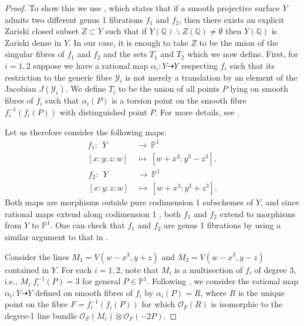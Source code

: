 \documentclass[11pt]{amsart}
\newcommand{\QQ}{\mathbb{Q}}
\newcommand{\PP}{\mathbb{P}}
\theoremstyle{plain}
\theoremstyle{remark}
\begin{document}
\begin{proof}
To show this we use \cite[Proposition 3.8]{twofibs}, which states that if a smooth projective surface $Y$ admits two different genus 1 fibrations $f_1$ and $f_2$, then there exists an explicit Zariski closed subset $Z\subset Y$ such that if $Y(\QQ)\backslash Z(\QQ)\neq \emptyset$ then $Y(\QQ)$ is Zariski dense in $Y$. 
In our case, it is enough to take $Z$ to be the union of the singular fibres of $f_1$ and $f_2$ and the sets $T_1$ and $T_2$ which we now define. First, for $i=1,2$ suppose we have a rational map $\alpha_i:Y\dashrightarrow Y$ respecting $f_i$ such that its restriction to the generic fibre $\mathcal{Y}_i$ is not merely a translation by an element of the Jacobian $J(\mathcal{Y}
_i)$. We define $T_i$ to be the union of all points $P$ lying on smooth fibres of $f_i$ such that $\alpha_i(P)$ is a torsion point on the smooth fibre $f_i^{-1}(f_i(P))$ with distinguished point $P$. For more details, see \cite[Section 2]{twofibs}. 

Let us therefore consider the following maps:
\begin{align*}
f_1:  \ \ Y  &  \xrightarrow{} \ \PP^1\\
[x:y:z:w] \ &\mapsto \ [w+x^3 : y^3-z^3],
\end{align*}
\begin{align*}
f_2:  \ \ Y  &  \xrightarrow{} \ \PP^1\\
[x:y:z:w] \ &\mapsto \ [w+x^3 : y^3+z^3].
\end{align*}
Both maps are morphisms outside pure codimension 1 subschemes of $Y$, and since rational maps extend along codimension 1 \cite[Proposition 4.1.16]{Liu}, both $f_1$ and $f_2$ extend to morphisms from $Y$ to $\PP^1$. One can check that $f_1$ and $f_2$ are genus 1 fibrations by using a similar argument to that in \cite[Proof of Theorem 2.1]{Cornnaka}.

Consider the lines $M_1=V(w-x^3, y+z)$ and $M_2=V(w-x^3, y-z)$ contained in $Y$. For each $i=1,2$, note that $M_i$ is a multisection of $f_i$ of degree 3, i.e., $M_i.f_i^{-1}(P)=3$ for general $P\in \PP^1$. Following \cite[Remark 2.4]{twofibs}, we consider the rational map $\alpha_i:Y \dashrightarrow Y $ defined on smooth fibres of $f_i$ by $\alpha_i(P)=R$, where $R$ is the unique point on the fibre $F=f_i^{-1}(f_i(P))$ for which $\mathcal{O}_F(R)$ is isomorphic to the degree-1 line bundle $\mathcal{O}_F(M_i)\otimes\mathcal{O}_F(-2P)$.


\end{proof}
\end{document}

